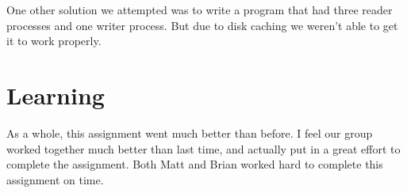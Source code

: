\documentclass[letterpaper,10pt,titlepage]{article}
\begin{document}
One other solution we attempted was to write a program that had three
reader processes and one writer process. But due to disk caching we
weren't able to get it to work properly.

\section*{Learning}

As a whole, this assignment went much better than before. I feel our
group worked together much better than last time, and actually put in a
great effort to complete the assignment. Both Matt and Brian worked hard
to complete this assignment on time.
\end{document}
